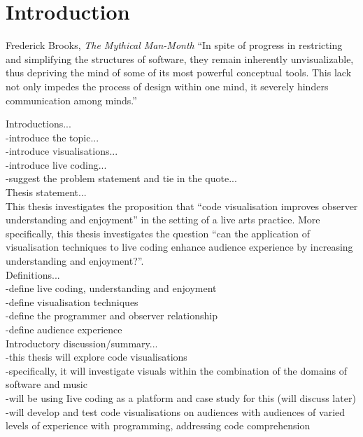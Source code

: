 
\chapter{Introduction}
\label{chap:introduction}

\begin{chapquote}{Frederick Brooks, \textit{The Mythical Man-Month}}
``In spite of progress in restricting and simplifying the structures of software, they remain inherently unvisualizable, thus depriving the mind of some of its most powerful conceptual tools. This lack not only impedes the process of design within one mind, it severely hinders communication among minds.''
\end{chapquote}

Introductions...\\
-introduce the topic...\\
-introduce visualisations...\\
-introduce live coding...\\
-suggest the problem statement and tie in the quote...\\

Thesis statement...\\
This thesis investigates the proposition that ``code visualisation improves observer understanding and enjoyment'' in the setting of a live arts practice. More specifically, this thesis investigates the question ``can the application of visualisation techniques to live coding enhance audience experience by increasing understanding and enjoyment?''.\\

Definitions...\\
-define live coding, understanding and enjoyment\\
-define visualisation techniques\\
-define the programmer and observer relationship\\
-define audience experience\\

Introductory discussion/summary...\\
-this thesis will explore code visualisations\\
-specifically, it will investigate visuals within the combination of the domains of software and music\\
-will be using Iive coding as a platform and case study for this (will discuss later)\\
-will develop and test code visualisations on audiences with audiences of varied levels of experience with programming, addressing code comprehension\\


